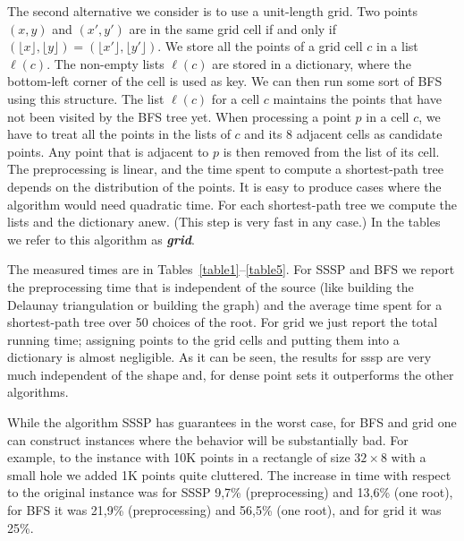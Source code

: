 \documentclass[a4paper,USenglish]{lipics}
\def\DEF#1{\textbf{\emph{#1}}}
\begin{document}
The second alternative we consider is to use a unit-length grid. 
Two points $(x,y)$ and $(x',y')$ are in the same grid cell
if and only if 
$(\lfloor x\rfloor ,\lfloor y\rfloor)=(\lfloor x'\rfloor ,\lfloor y'\rfloor)$.
We store all the points of a grid cell $c$ in a list $\ell(c)$.
The non-empty lists $\ell(c)$ are stored in a dictionary,
where the bottom-left corner of the cell is used as key.
We can then run some sort of BFS using this structure. 
The list $\ell(c)$ for a cell $c$ maintains the points that
have not been visited by the BFS tree yet. When processing
a point $p$ in a cell $c$, we have to treat all the points 
in the lists of $c$ and its $8$ adjacent cells as candidate points.
Any point that is adjacent to $p$ is then removed from the list of its cell. 
The preprocessing is linear, and the time spent to compute
a shortest-path tree depends on the distribution of the points.
It is easy to produce cases where the algorithm would need quadratic time.
For each shortest-path tree we compute the lists and the dictionary anew.
(This step is very fast in any case.)
In the tables we refer to this algorithm as \DEF{grid}.

The measured times are in Tables~\ref{table1}--\ref{table5}.
For SSSP and BFS we report the preprocessing time that is independent of the source
(like building the Delaunay triangulation or building the graph) and the average
time spent for a shortest-path tree over 50 choices of the root.
For grid we just report the total running time; assigning points to
the grid cells and putting them into a dictionary is almost negligible.
As it can be seen, the results for sssp are very much independent of the shape and,
for dense point sets it outperforms the other algorithms.

While the algorithm SSSP has guarantees in the worst case,
for BFS and grid one can construct instances 
where the behavior will be substantially bad. 
For example, to the instance with 10K points in a rectangle of size $32\times 8$ 
with a small hole we added 1K points quite cluttered. 
The increase in time with respect to the original instance 
was for SSSP 9,7\% (preprocessing) and 13,6\% (one root), for BFS it was
21,9\% (preprocessing) and 56,5\% (one root), and for grid it was 25\%.
\end{document}
